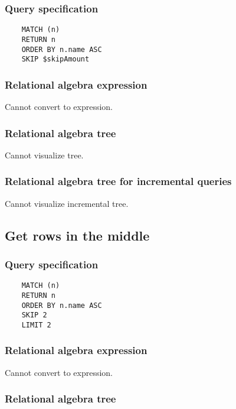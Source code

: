 	\subsubsection*{Query specification}

	\begin{lstlisting}
	MATCH (n)
	RETURN n
	ORDER BY n.name ASC
	SKIP $skipAmount
	\end{lstlisting}


	\subsubsection*{Relational algebra expression}

	Cannot convert to expression.

	\subsubsection*{Relational algebra tree}

	Cannot visualize tree.

	\subsubsection*{Relational algebra tree for incremental queries}

	Cannot visualize incremental tree.
	\subsection{Get rows in the middle}

	\subsubsection*{Query specification}

	\begin{lstlisting}
	MATCH (n)
	RETURN n
	ORDER BY n.name ASC
	SKIP 2
	LIMIT 2
	\end{lstlisting}


	\subsubsection*{Relational algebra expression}

	Cannot convert to expression.

	\subsubsection*{Relational algebra tree}

